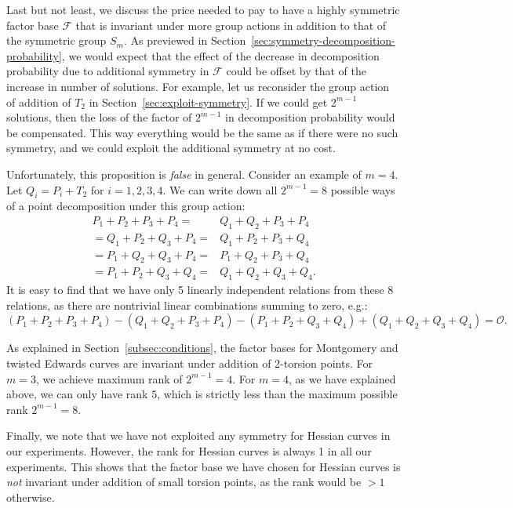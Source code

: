 Last but not least, we discuss the price needed to pay to have a
highly symmetric factor base $\mathcal F$ that is invariant under more
group actions in addition to that of the symmetric group $S_m$.
%
As previewed in Section~\ref{sec:symmetry-decomposition-probability},
we would expect that the effect of the decrease in decomposition
probability due to additional symmetry in $\mathcal F$ could be offset
by that of the increase in number of solutions.
%
For example, let us reconsider the group action of addition of $T_2$
in Section~\ref{sec:exploit-symmetry}.
%
If we could get $2^{m-1}$ solutions, then the loss of the factor of
$2^{m-1}$ in decomposition probability would be compensated.
%
This way everything would be the same as if there were no such
symmetry, and we could exploit the additional symmetry at no cost.

Unfortunately, this proposition is \emph{false} in general.
%
Consider an example of $m=4$.
%
Let $Q_i=P_i+ T_2$ for $i=1,2,3,4$.
%
We can write down all $2^{m-1}=8$ possible ways of a point
decomposition under this group action:
%
\[ \begin{aligned}
P_1 + P_2 + P_3 + P_4 = & Q_1 + Q_2 + P_3 + P_4 \\
= Q_1 + P_2 + Q_3 + P_4 = & Q_1 + P_2 + P_3 + Q_4 \\
= P_1 + Q_2 + Q_3 + P_4 = & P_1 + Q_2 + P_3 + Q_4 \\
= P_1 + P_2 + Q_3 + Q_4 = & Q_1 + Q_2 + Q_3 + Q_4.
\end{aligned} \]
%
It is easy to find that we have only 5 linearly independent relations
from these 8 relations, as there are nontrivial linear combinations
summing to zero, e.g.:
\[ (P_1 + P_2 + P_3 + P_4) - (Q_1 + Q_2 + P_3 + P_4) - (P_1 + P_2 +
  Q_3 + Q_4) + (Q_1 + Q_2 + Q_3 + Q_4) = \mathcal O.\]


As explained in Section~\ref{subsec:conditions}, the factor bases for
Montgomery and twisted Edwards curves are invariant under addition of
2-torsion points.
%
For $m=3$, we achieve maximum rank of $2^{m-1}=4$.
%
For $m=4$, as we have explained above, we can only have rank $5$, 
which is strictly less than the maximum possible rank $2^{m-1}=8$.

Finally, we note that we have not exploited any symmetry for Hessian
curves in our experiments.
%
However, the rank for Hessian curves is always 1 in all our
experiments.
%
This shows that the factor base we have chosen for Hessian curves is
\emph{not} invariant under addition of small torsion points, as the
rank would be $>1$ otherwise.





